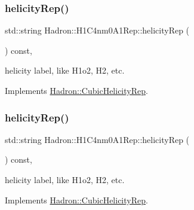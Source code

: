 \mbox{\label{structHadron_1_1H1C4nm0A1Rep_a018d2e78677dfe6d57d9cbc95e554618}} 
\subsubsection{\texorpdfstring{helicityRep()}{helicityRep()}\hspace{0.1cm}{\footnotesize\ttfamily [1/2]}}
{\footnotesize\ttfamily std\+::string Hadron\+::\+H1\+C4nm0\+A1\+Rep\+::helicity\+Rep (\begin{DoxyParamCaption}{ }\end{DoxyParamCaption}) const\hspace{0.3cm}{\ttfamily [inline]}, {\ttfamily [virtual]}}

helicity label, like H1o2, H2, etc. 

Implements \mbox{\hyperlink{structHadron_1_1CubicHelicityRep_af1096946b7470edf0a55451cc662f231}{Hadron\+::\+Cubic\+Helicity\+Rep}}.

\mbox{\label{structHadron_1_1H1C4nm0A1Rep_a018d2e78677dfe6d57d9cbc95e554618}} 
\subsubsection{\texorpdfstring{helicityRep()}{helicityRep()}\hspace{0.1cm}{\footnotesize\ttfamily [2/2]}}
{\footnotesize\ttfamily std\+::string Hadron\+::\+H1\+C4nm0\+A1\+Rep\+::helicity\+Rep (\begin{DoxyParamCaption}{ }\end{DoxyParamCaption}) const\hspace{0.3cm}{\ttfamily [inline]}, {\ttfamily [virtual]}}

helicity label, like H1o2, H2, etc. 

Implements \mbox{\hyperlink{structHadron_1_1CubicHelicityRep_af1096946b7470edf0a55451cc662f231}{Hadron\+::\+Cubic\+Helicity\+Rep}}.

\mbox{\label{structHadron_1_1H1C4nm0A1Rep_acc6e3a3585fdfea2b5ef14c6035964e2}} 

